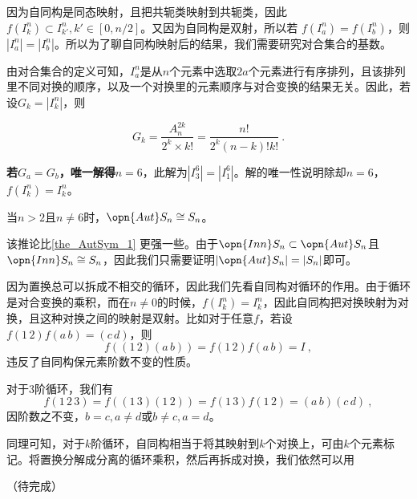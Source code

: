 因为自同构是同态映射，且把共轭类映射到共轭类，因此$f(I_k^n)\subset I_{k'}^n,k'\in [0,n/2]$。又因为自同构是双射，所以若 $f(I_a^n)=f(I_b^n)$，则$|I_a^n|=|I_b^n|$。所以为了聊自同构映射后的结果，我们需要研究对合集合的基数。

由对合集合的定义可知，$I_a^n$是从$n$个元素中选取$2a$个元素进行有序排列，且该排列里不同对换的顺序，以及一个对换里的元素顺序与对合变换的结果无关。因此，若设$G_k=|I_k^n|$，则

\begin{equation}
G_k=\frac{A_{n}^{2k}}{2^k\times k!}=\frac{n!}{2^k(n-k)!k!}~.
\end{equation}

\textbf{若$G_a=G_b$，唯一解得$n=6$}，此解为$|I^6_3|=|I^6_1|$。解的唯一性说明除却$n=6$，$f(I_k^n)=I_k^n$。

\begin{corollary}{}
当$n>2$且$n\neq 6$时，$\opn{Aut}S_n\cong S_n$。
\end{corollary}
该推论比\autoref{the_AutSym_1} 更强一些。由于$\opn{Inn}S_n\subset \opn{Aut} S_n$且$\opn{Inn}S_n\cong S_n$，因此我们只需要证明$|\opn{Aut}S_n|=|S_n|$即可。

因为置换总可以拆成不相交的循环，因此我们先看自同构对循环的作用。由于循环是对合变换的乘积，而在$n\neq 0$的时候，$f(I_k^n)=I_k^n$，因此自同构把对换映射为对换，且这种对换之间的映射是双射。比如对于任意$f$，若设$f(1\,2)f(a\,b)=(c\,d)$，则
\begin{equation}
f((1\,2)(a\,b))=f(1\,2)f(a\,b)=I~,
\end{equation}
违反了自同构保元素阶数不变的性质。

对于3阶循环，我们有
\begin{equation}
f(1\,2\,3)=f((1\,3)(1\,2))=f(1\,3)f(1\,2)=(a\,b)(c\,d)~,
\end{equation}
因阶数之不变，$b=c,a\neq d$或$b\neq c,a=d$。

同理可知，对于$k$阶循环，自同构相当于将其映射到$k$个对换上，可由$k$个元素标记。将置换分解成分离的循环乘积，然后再拆成对换，我们依然可以用

（待完成）
